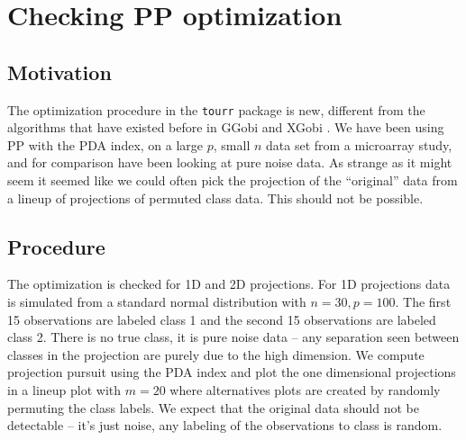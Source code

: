 \documentclass[12]{report}
\begin{document}
%
%
%
%
%
%

\section{Checking PP optimization} \label{sec:largep}

\subsection{Motivation}

The optimization procedure in the  \texttt{tourr} package is new, different from the algorithms that have existed before in GGobi \cite{STLBC03} and XGobi \cite{SCB91}. 
We have been using PP with the PDA index, on a large $p$, small $n$ data set from a microarray study, and for comparison have been looking at pure noise data. As strange as it might seem it seemed like we could often pick the projection of the  ``original'' data from a lineup of projections of permuted class data. This should not be possible. 

\subsection{Procedure}

The optimization is checked for 1D and 2D projections. For 1D projections data is simulated from a standard normal distribution with $n=30, p=100$. The first 15 observations are labeled class 1 and the second 15 observations are labeled class 2. There is no true class, it is pure noise data -- any separation seen between classes in the projection are purely due to the high dimension. We compute projection pursuit using the PDA index and plot the one dimensional projections in a lineup plot with $m=20$ where alternatives plots are created by randomly permuting the class labels. We expect that the original data should not be detectable -- it's just noise, any labeling of the observations to class is random. 
\end{document}
